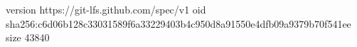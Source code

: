 version https://git-lfs.github.com/spec/v1
oid sha256:c6d06b128c33031589f6a33229403b4c950d8a91550e4dfb09a9379b70f541ee
size 43840
